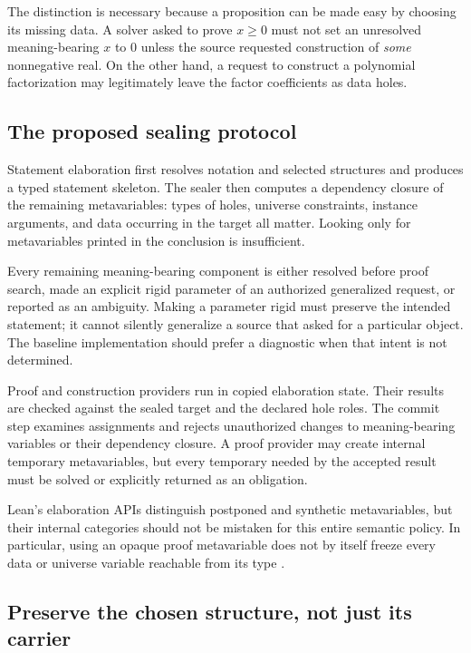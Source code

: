 \documentclass[11pt,a4paper]{article}
\theoremstyle{definition}
\theoremstyle{remark}
\begin{document}
The distinction is necessary because a proposition can be made easy by choosing
its missing data. A solver asked to prove $x\ge0$ must not set an unresolved
meaning-bearing $x$ to $0$ unless the source requested construction of \emph{some}
nonnegative real. On the other hand, a request to construct a polynomial
factorization may legitimately leave the factor coefficients as data holes.

\subsection{The proposed sealing protocol}

Statement elaboration first resolves notation and selected structures and
produces a typed statement skeleton. The sealer then computes a dependency
closure of the remaining metavariables: types of holes, universe constraints,
instance arguments, and data occurring in the target all matter. Looking only
for metavariables printed in the conclusion is insufficient.

Every remaining meaning-bearing component is either resolved before proof
search, made an explicit rigid parameter of an authorized generalized request,
or reported as an ambiguity. Making a parameter rigid must preserve the
intended statement; it cannot silently generalize a source that asked for a
particular object. The baseline implementation should prefer a diagnostic when
that intent is not determined.

Proof and construction providers run in copied elaboration state. Their
results are checked against the sealed target and the declared hole roles.
The commit step examines assignments and rejects unauthorized changes to
meaning-bearing variables or their dependency closure. A proof provider may
create internal temporary metavariables, but every temporary needed by the
accepted result must be solved or explicitly returned as an obligation.

Lean's elaboration APIs distinguish postponed and synthetic metavariables,
but their internal categories should not be mistaken for this entire semantic
policy. In particular, using an opaque proof metavariable does not by itself
freeze every data or universe variable reachable from its type
\cite{lean-synthetic,lean-elaborators}.

\subsection{Preserve the chosen structure, not just its carrier}
\end{document}
